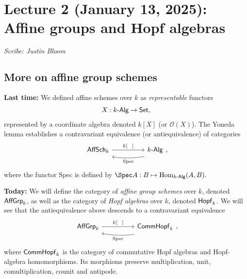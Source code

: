 \section{Lecture 2 (January 13, 2025): Affine groups and Hopf algebras}\label{lec2}
\noindent\textit{Scribe: Justin Bloom}
\subsection*{More on affine group schemes}
\textbf{Last time:} We defined affine schemes over $k$ as \textit{representable} functors \[X : k{\text{-}\sf Alg} \to {\sf Set},\] represented by a coordinate algebra denoted $k[X]$ (or $\mathcal{O}(X)$). The Yoneda lemma establishes a contravariant equivalence (or antiequivalence) of categories
\[\begin{tikzcd}
	{{\sf AffSch}_k} && {k\text{-}{\sf Alg}}
	\arrow["{k[\phantom{X}]}", from=1-1, to=1-3]
	\arrow["{\mathrm{Spec}}", shift left=3, bend left = 8, from=1-3, to=1-1]
\end{tikzcd},\]
where the functor $\mathrm{Spec}$ is defined by $\Spec A : B \mapsto \mathrm{Hom}_{k\text{-}{\sf Alg}}(A, B).$

\textbf{Today:} We will define the category of \textit{affine group schemes} over $k$, denoted ${\sf AffGrp}_k$, as well as the category of \textit{Hopf algebras} over $k$, denoted ${\sf Hopf}_k$. We will see that the antiequivalence above descends to a contravariant equivalence
\[\begin{tikzcd}
	{{\sf AffGrp}_k} && {{\sf CommHopf}_k}
	\arrow["{k[\phantom{X}]}", from=1-1, to=1-3]
	\arrow["{\mathrm{Spec}}", shift left=3, bend left = 8, from=1-3, to=1-1]
\end{tikzcd},\]
where ${\sf CommHopf}_k$ is the category of commutative Hopf algebras and Hopf-algebra homomorphisms. Its morphisms preserve multiplication, unit, comultiplication, counit and antipode.

